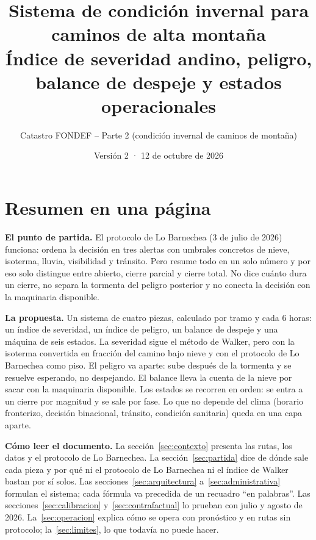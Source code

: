 \documentclass[11pt,a4paper]{article}
\title{\textbf{Sistema de condición invernal para caminos de alta montaña}\\[4pt]
\large Índice de severidad andino, peligro, balance de despeje y estados operacionales}
\author{Catastro FONDEF -- Parte 2 (condición invernal de caminos de montaña)}
\date{Versión 2 · 12 de octubre de 2026}
\begin{document}
\maketitle

\section*{Resumen en una página}

\textbf{El punto de partida.} El protocolo de Lo Barnechea (3 de julio de 2026) funciona: ordena la decisión en tres alertas con umbrales concretos de nieve, isoterma, lluvia, visibilidad y tránsito. Pero resume todo en un solo número y por eso solo distingue entre abierto, cierre parcial y cierre total. No dice cuánto dura un cierre, no separa la tormenta del peligro posterior y no conecta la decisión con la maquinaria disponible.

\textbf{La propuesta.} Un sistema de cuatro piezas, calculado por tramo y cada 6 horas: un índice de severidad, un índice de peligro, un balance de despeje y una máquina de seis estados. La severidad sigue el método de Walker, pero con la isoterma convertida en fracción del camino bajo nieve y con el protocolo de Lo Barnechea como piso. El peligro va aparte: sube después de la tormenta y se resuelve esperando, no despejando. El balance lleva la cuenta de la nieve por sacar con la maquinaria disponible. Los estados se recorren en orden: se entra a un cierre por magnitud y se sale por fase. Lo que no depende del clima (horario fronterizo, decisión binacional, tránsito, condición sanitaria) queda en una capa aparte.



\textbf{Cómo leer el documento.} La sección~\ref{sec:contexto} presenta las rutas, los datos y el protocolo de Lo Barnechea. La sección~\ref{sec:partida} dice de dónde sale cada pieza y por qué ni el protocolo de Lo Barnechea ni el índice de Walker bastan por sí solos. Las secciones~\ref{sec:arquitectura} a~\ref{sec:administrativa} formulan el sistema; cada fórmula va precedida de un recuadro ``en palabras''. Las secciones~\ref{sec:calibracion} y~\ref{sec:contrafactual} lo prueban con julio y agosto de 2026. La~\ref{sec:operacion} explica cómo se opera con pronóstico y en rutas sin protocolo; la~\ref{sec:limites}, lo que todavía no puede hacer.

\newpage
\end{document}
